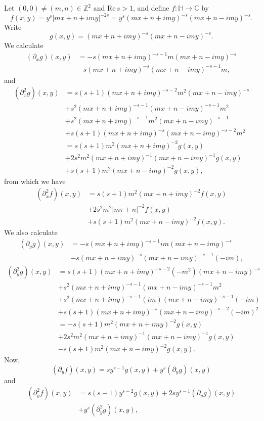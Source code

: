\documentclass{article}
\def\Re{\ensuremath{\mathrm{Re}}\,}
\theoremstyle{definition}
\theoremstyle{definition}
\begin{document}
Let $(0,0) \neq (m,n) \in \mathbb{Z}^2$ and $\Re s>1$, and define $f:\mathbb{H} \to \mathbb{C}$ by
\[
f(x,y) = y^s |mx+n+imy|^{-2s} = 
y^s (mx+n+imy)^{-s}(mx+n-imy)^{-s}.
\]
Write
\[
g(x,y) = (mx+n+imy)^{-s}(mx+n-imy)^{-s}.
\]
We calculate
\begin{align*}
(\partial_x g)(x,y)&=
-s(mx+n+imy)^{-s-1}m(mx+n-imy)^{-s}\\
&-s(mx+n+imy)^{-s}(mx+n-imy)^{-s-1}m,
\end{align*}
and
\begin{align*}
(\partial_x^2 g)(x,y)&=s(s+1)(mx+n+imy)^{-s-2}m^2(mx+n-imy)^{-s}\\
&+s^2(mx+n+imy)^{-s-1} (mx+n-imy)^{-s-1}m^2\\
&+s^2(mx+n+imy)^{-s-1} m^2 (mx+n-imy)^{-s-1}\\
&+s(s+1)(mx+n+imy)^{-s}(mx+n-imy)^{-s-2}m^2\\
&=s(s+1)m^2 (mx+n+imy)^{-2} g(x,y)\\
&+2s^2m^2(mx+n+imy)^{-1}(mx+n-imy)^{-1} g(x,y)\\
&+s(s+1)m^2 (mx+n-imy)^{-2} g(x,y),
\end{align*}
from which we have
\begin{align*}
(\partial_x^2 f)(x,y)&=s(s+1)m^2(mx+n+imy)^{-2} f(x,y)\\
&+2s^2m^2|m\tau+n|^{-2} f(x,y)\\
&+s(s+1)m^2(mx+n-imy)^{-2} f(x,y).
\end{align*}
We also calculate
\begin{align*}
(\partial_y g)(x,y)&=-s(mx+n+imy)^{-s-1} im (mx+n-imy)^{-s}\\
&-s(mx+n+imy)^{-s} (mx+n-imy)^{-s-1} (-im),
\end{align*}
\begin{align*}
(\partial_y^2 g)(x,y)&=s(s+1)(mx+n+imy)^{-s-2} (-m^2)(mx+n-imy)^{-s}\\
&+s^2(mx+n+imy)^{-s-1}(mx+n-imy)^{-s-1} m^2\\
&+s^2(mx+n+imy)^{-s-1}(im)(mx+n-imy)^{-s-1}(-im)\\
&+s(s+1)(mx+n+imy)^{-s}(mx+n-imy)^{-s-2}(-im)^2\\
&=-s(s+1)m^2(mx+n+imy)^{-2}g(x,y)\\
&+2s^2m^2(mx+n+imy)^{-1}(mx+n-imy)^{-1} g(x,y)\\
&-s(s+1)m^2(mx+n-imy)^{-2} g(x,y).
\end{align*}
Now,
\[
(\partial_y f)(x,y) = sy^{s-1} g(x,y)+y^s (\partial_y g)(x,y)
\]
and
\begin{align*}
(\partial_y^2 f)(x,y)&=s(s-1) y^{s-2} g(x,y)+2sy^{s-1} (\partial_y g)(x,y)\\
&+ y^s (\partial_y^2 g)(x,y),
\end{align*}
\end{document}
